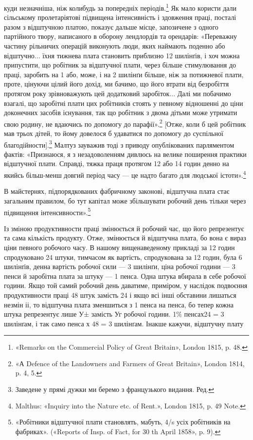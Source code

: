 куди незначніша, ніж колибудь за попередніх періодів.\footnote{
«Remarks on the Commercial Policy of Great Britain», London
1815, p. 48.
} Як
мало користи дали сільському пролетаріятові підвищена інтенсивність
і здовження праці, посталі разом з відштучною платою,
показує дальше місце, запозичене з одного партійного твору,
написаного в оборону лендлордів та орендарів: «Переважну
частину рільничих операцій виконують люди, яких наймають
поденно або відштучно... їхня тижнева плата становить приблизно
12 шилінґів, і хоч можна припустити, що робітник за відштучної
плати, через більше стимулювання до праці, заробить на 1 або,
може, і на 2 шилінґи більше, ніж за потижневої плати, проте,
цінуючи цілий його дохід, ми бачимо, що його втрати від безробіття
протягом року зрівноважують цей додатковий заробіток...
Далі ми побачимо взагалі, що заробітні плати цих робітників
стоять у певному відношенні до ціни доконечних засобів існування,
так що робітник з двома дітьми може утримати свою родину,
не вдаючись по допомогу до парафії».\footnote{
«А Defence of the Landowners and Farmers of Great Britain», London
1814, p. 4, 5.
} [Отже, коли б цей
робітник мав трьох дітей, то йому довелося б удаватися по допомогу
до суспільної благодійности].\footnote*{
Заведене у прямі дужки ми беремо з французького видання. Ред.
} Малтуз зауважив тоді з
приводу опублікованих парляментом фактів: «Признаюся, я з
незадоволенням дивлюсь на велике поширення практики відштучної
плати. Справді, тяжка праця протягом 12 або 14 годин
денно на якийсь більш-менш довгий період часу — це надто багато
для людської істоти».\footnote{
Malthus: «Inquiry into the Nature etc. of Rent.», London 1815,
p. 49 Note.
}

В майстернях, підпорядкованих фабричному законові, відштучна
плата стає загальним правилом, бо тут капітал може збільшувати
робочий день тільки через підвищення інтенсивности».\footnote{
«Робітники відштучної плати становлять, мабуть, 4/s усіх робітників
на фабриках». («Reports of Insp. of Fact, for 30 th April
1858», p. 9).
}

Із зміною продуктивности праці змінюється й робочий час,
що його репрезентує та сама кількість продукту. Отже, змінюється
й відштучна плата, бо вона є вираз ціни певного робочого
часу. В нашому вищенаведеному прикладі за 12 годин спродуковано
24 штуки, тимчасом як вартість, спродукована за 12 годин,
була 6 шилінґів, денна вартість робочої сили — 3 шилінґи,
ціна робочої години — 3 пенси й заробітна плата за штуку —
1 пенса. Одна штука вбирала в себе  робочої години. Якщо
той самий робочий день даватиме, приміром, у наслідок подвоєння
продуктивности праці 48 штук замість 24 і якщо всі інші
обставини лишаться незмін іі, то відштучна плата зменшиться
з 1 пенса на  пенса, бо тепер кожна штука репрезентує лише
У± замість Уг робочої години. 1\% пенсах24 = 3 шилінґам, і так
само  пенса х 48 = 3 шилінґам. Інакше кажучи, відштучну плату